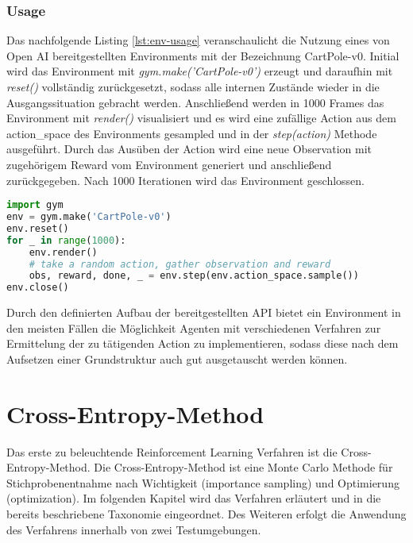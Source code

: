 \documentclass[11pt]{scrartcl}
\begin{document}
\subsubsection{Usage}
Das nachfolgende Listing \autoref{lst:env-usage} veranschaulicht die Nutzung eines von Open AI
bereitgestellten Environments mit der Bezeichnung CartPole-v0. Initial wird das Environment
mit \textit{gym.make('CartPole-v0')} erzeugt und daraufhin mit \textit{reset()} vollständig
zurückgesetzt, sodass alle internen Zustände wieder in die Ausgangssituation gebracht werden. 
Anschließend werden in 1000 Frames das Environment mit \textit{render()} visualisiert und es
wird eine zufällige Action aus dem action\_space des Environments gesampled und in der
\textit{step(action)} Methode ausgeführt. Durch das Ausüben der Action wird eine neue
Observation mit zugehörigem Reward vom Environment generiert und anschließend zurückgegeben.
Nach 1000 Iterationen wird das Environment geschlossen. 
\begin{lstlisting}[language=Python, caption=environment usage, label=lst:env-usage]
import gym
env = gym.make('CartPole-v0')
env.reset()
for _ in range(1000):
    env.render()
    # take a random action, gather observation and reward
    obs, reward, done, _ = env.step(env.action_space.sample())
env.close()
\end{lstlisting}

\noindent
Durch den definierten Aufbau der bereitgestellten API bietet ein Environment in den meisten Fällen
die Möglichkeit Agenten mit verschiedenen Verfahren zur Ermittelung der zu tätigenden Action zu
implementieren, sodass diese nach dem Aufsetzen einer Grundstruktur auch gut ausgetauscht werden
können.


\newpage
\section{Cross-Entropy-Method}
Das erste zu beleuchtende Reinforcement Learning Verfahren ist die Cross-Entropy-Method. Die
Cross-Entropy-Method ist eine Monte Carlo Methode für Stichprobenentnahme nach Wichtigkeit
(importance sampling) und Optimierung (optimization). Im folgenden Kapitel wird das Verfahren
erläutert und in die bereits beschriebene Taxonomie eingeordnet. Des Weiteren erfolgt die
Anwendung des Verfahrens innerhalb von zwei Testumgebungen. 
\end{document}
